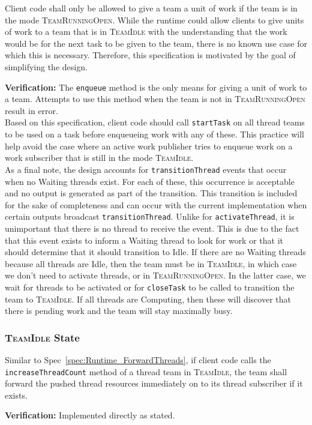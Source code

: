 \documentclass{article}
\newcommand{\TeamIdle}          {\textsc{TeamIdle}}
\newcommand{\TeamRunningOpen}   {\textsc{TeamRunningOpen}}
\begin{document}
\begin{spec}
\label{spec:Runtime_NoEnqueue}
Client code shall only be allowed to give a team a unit of work if the team is
in the mode {\TeamRunningOpen}.  While the runtime could allow clients to give
units of work to a team that is in {\TeamIdle} with the understanding that the
work would be for the next task to be given to the team, there is no known use
case for which this is necessary.  Therefore, this specification is motivated by
the goal of simplifying the design.
\end{spec}
\textbf{Verification:}\hspace{0.125in}  The \texttt{enqueue} method is the only
means for giving a unit of work to a team.  Attempts to use this method when the
team is not in {\TeamRunningOpen} result in error.\\

Based on this specification, client code should call \texttt{startTask} on all
thread teams to be used on a task before enqueueing work with any of these.  This
practice will help avoid the case where an active work publisher tries to
enqueue work on a work subscriber that is still in the mode \TeamIdle.\\

As a final note, the design accounts for \texttt{transitionThread} events that
occur when no Waiting threads exist.  For each of these, this occurrence is
acceptable and no output is generated as part of the transition.  This
transition is included for the sake of completeness and can occur with the
current implementation when certain outputs broadcast \texttt{transitionThread}.
Unlike for \texttt{activateThread}, it is unimportant that there is no thread to
receive the event.  This is due to the fact that this event exists to inform a
Waiting thread to look for work or that it should determine that it should
transition to Idle.  If there are no Waiting threads because all threads are
Idle, then the team must be in \TeamIdle, in which case we don't need to
activate threads, or in \TeamRunningOpen.  In the latter case, we wait for
threads to be activated or for \texttt{closeTask} to be called to transition
the team to \TeamIdle.  If all threads are Computing, then these will discover
that there is pending work and the team will stay maximally busy.

\subsubsection{{\TeamIdle} State}
\begin{spec}
Similar to Spec~\ref{spec:Runtime_ForwardThreads}, if client code calls the
\texttt{increaseThreadCount} method of a thread team in \TeamIdle, the team shall
forward the pushed thread resources immediately on to its thread subscriber if
it exists.
\end{spec}
\textbf{Verification:}\hspace{0.125in}  Implemented directly as stated.
\end{document}
